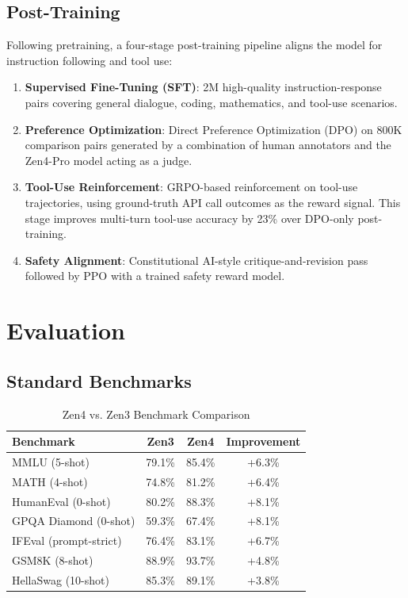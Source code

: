 \documentclass[11pt,a4paper]{article}
\begin{document}
\subsection{Post-Training}

Following pretraining, a four-stage post-training pipeline aligns the model for instruction
following and tool use:

\begin{enumerate}
    \item \textbf{Supervised Fine-Tuning (SFT)}: 2M high-quality instruction-response pairs
    covering general dialogue, coding, mathematics, and tool-use scenarios.
    \item \textbf{Preference Optimization}: Direct Preference Optimization (DPO) on 800K
    comparison pairs generated by a combination of human annotators and the Zen4-Pro
    model acting as a judge.
    \item \textbf{Tool-Use Reinforcement}: GRPO-based reinforcement on tool-use trajectories,
    using ground-truth API call outcomes as the reward signal. This stage
    improves multi-turn tool-use accuracy by 23\% over DPO-only post-training.
    \item \textbf{Safety Alignment}: Constitutional AI-style critique-and-revision pass
    followed by PPO with a trained safety reward model.
\end{enumerate}

\section{Evaluation}

\subsection{Standard Benchmarks}

\begin{table}[H]
\centering
\begin{tabular}{lccc}
\toprule
\textbf{Benchmark} & \textbf{Zen3} & \textbf{Zen4} & \textbf{Improvement} \\
\midrule
MMLU (5-shot)         & 79.1\% & 85.4\% & +6.3\% \\
MATH (4-shot)         & 74.8\% & 81.2\% & +6.4\% \\
HumanEval (0-shot)    & 80.2\% & 88.3\% & +8.1\% \\
GPQA Diamond (0-shot) & 59.3\% & 67.4\% & +8.1\% \\
IFEval (prompt-strict)& 76.4\% & 83.1\% & +6.7\% \\
GSM8K (8-shot)        & 88.9\% & 93.7\% & +4.8\% \\
HellaSwag (10-shot)   & 85.3\% & 89.1\% & +3.8\% \\
\bottomrule
\end{tabular}
\caption{Zen4 vs. Zen3 Benchmark Comparison}
\end{table}
\end{document}
